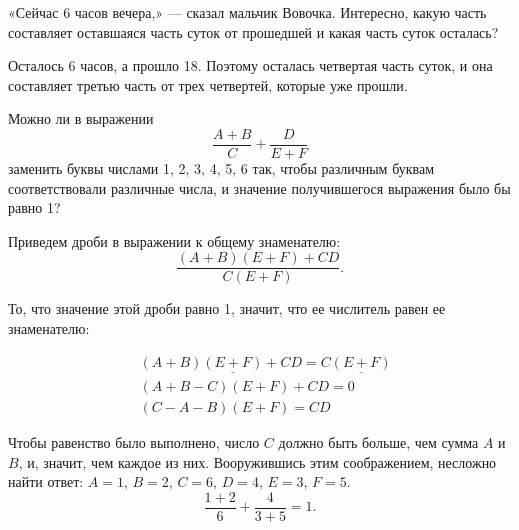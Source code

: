\begin{itemize}

	\itA «Сейчас 6 часов вечера,» — сказал мальчик Вовочка. Интересно, какую часть составляет оставшаяся часть суток от прошедшей и какая часть суток осталась?
	
	\itr Осталось 6 часов, а прошло 18. Поэтому осталась четвертая часть суток, и она составляет третью часть от трех четвертей, которые уже прошли.
	
	\itC Можно ли в выражении
	$$\frac{A+B}{C} + \frac{D}{E+F}$$
	заменить буквы числами 1, 2, 3, 4, 5, 6 так, чтобы различным буквам соответствовали различные числа, и значение получившегося выражения было бы равно 1?
	
	\itr Приведем дроби в выражении к общему знаменателю:
	$$\frac{(A+B)(E+F) + CD}{C(E+F)}.$$
	
	То, что значение этой дроби равно 1, значит, что ее числитель равен ее знаменателю:

	\vspace{-0.6cm}
	\begin{align*}
		& (A+B) \underline{(E+F)} + CD = C \underline{(E+F)} \\
		& (A+B-C)(E+F) + CD = 0 \\
		& (C-A-B)(E+F) = CD
	\end{align*}
	
	Чтобы равенство было выполнено, число $C$ должно быть больше, чем сумма $A$ и $B$, и, значит, чем каждое из них. Вооружившись этим соображением, несложно найти ответ: $A=1$, $B=2$, $C=6$, $D=4$, $E=3$, $F=5$.
	$$\frac{1+2}{6}+\frac{4}{3+5} = 1.$$
	
\end{itemize}


